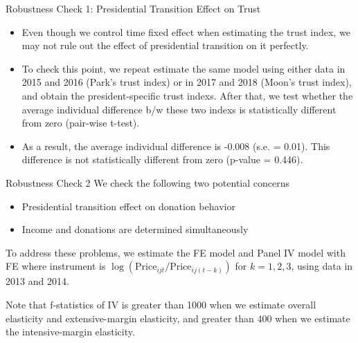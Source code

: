 \documentclass[
  ignorenonframetext,
]{beamer}
\providecommand{\tightlist}{%
  \setlength{\itemsep}{0pt}\setlength{\parskip}{0pt}}
\begin{document}
\begin{frame}{Robustness Check 1: Presidential Transition Effect on
Trust}
\protect\hypertarget{robustness-check-1-presidential-transition-effect-on-trust}{}
\begin{itemize}
\tightlist
\item
  Even though we control time fixed effect when estimating the trust
  index, we may not rule out the effect of presidential transition on it
  perfectly.
\item
  To check this point, we repeat estimate the same model using either
  data in 2015 and 2016 (Park's trust index) or in 2017 and 2018 (Moon's
  trust index), and obtain the president-specific trust indexs. After
  that, we test whether the average individual difference b/w these two
  indexs is statistically different from zero (pair-wise t-test).
\item
  As a result, the average individual difference is -0.008 (s.e. =
  0.01). This difference is not statistically different from zero
  (p-value = 0.446).
\end{itemize}
\end{frame}

\begin{frame}{Robustness Check 2}
\protect\hypertarget{robustness-check-2-1}{}
We check the following two potential concerns

\begin{itemize}
\tightlist
\item
  Presidential transition effect on donation behavior
\item
  Income and donations are determined simultaneously
\end{itemize}

To address these problems, we estimate the FE model and Panel IV model
with FE where instrument is
\(\log(\text{Price}_{ijt}/\text{Price}_{ij(t-k)})\) for \(k = 1, 2, 3\),
using data in 2013 and 2014.

Note that f-statistics of IV is greater than 1000 when we estimate
overall elasticity and extensive-margin elasticity, and greater than 400
when we estimate the intensive-margin elasticity.
\end{frame}
\end{document}
